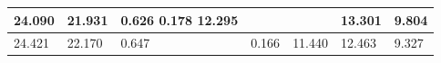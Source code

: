 \begin{tabular}{lllllll}
\toprule
24.090 & 21.931 & 0.626 0.178 12.295 &  &  & 13.301 & 9.804 \\
\midrule
24.421 & 22.170 & 0.647 & 0.166 & 11.440 & 12.463 & 9.327 \\
\bottomrule
\end{tabular}
